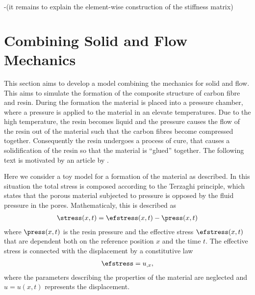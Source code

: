 \documentclass[twoside,a4paper,12pt,draft]{article}
\newcommand{\note}[1]{{\color{red}(#1)}}
\newcommand{\note}[1]{}
\begin{document}
-\note{it remains to explain the element-wise construction of the stiffness matrix}

\section{Combining Solid and Flow Mechanics}

This section aims to develop a model combining the mechanics for solid
and flow. This aims to simulate the formation of the composite
structure of carbon fibre and resin. During the formation the material
is placed into a pressure chamber, where a pressure is applied to the
material in an elevate temperatures. Due to the high temperature, the
resin becomes liquid and the pressure causes the flow of the resin out
of the material such that the carbon fibres become compressed
together. Consequently the resin undergoes a process of cure, that
causes a solidification of the resin so that the material is ``glued''
together. The following text is motivated by an article by
\citet{Hubert1999}.

Here we consider a toy model for a formation of the material as
described.  In this situation the total stress is composed according
to the Terzaghi principle, which states that the porous material
subjected to pressure is opposed by the fluid pressure in the
pores. Mathematicaly, this is described as
%
\begin{align}
\stress(x,t) = \efstress(x,t) - \press(x,t) \label{eq:flow-stress}
\end{align}
%
where $\press(x,t)$ is the resin pressure and the effective stress
$\efstress(x,t)$ that are dependent both on the reference position $x$ and
the time $t$. The effective stress is connected with the
displacement by a constitutive law
\begin{align}
\efstress = u_{,x},
\end{align}
%
where the parameters describing the properties of the material are
neglected and $u= u(x,t)$ represents the displacement.
\end{document}
